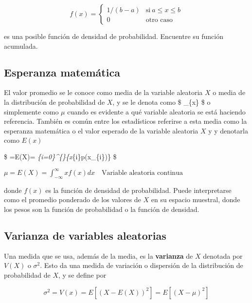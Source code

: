 \documentclass[11pt]{article}
\begin{document}
\begin{equation}
     \label{eq:aqui-le-mostramos-como-hacerle-la-llave-grande}
     f(x) = \left\{
           \begin{array}{ll}
             1/(b-a)     & \mathrm{si\ } a \leq x \le b \\
             0 & \mathrm{\text{otro caso}  } 
           \end{array}
         \right.
   \end{equation}

es una posible función de densidad de probabilidad. Encuentre su función
acumulada.

    \hypertarget{esperanza-matemuxe1tica}{%
\subsection{Esperanza matemática}\label{esperanza-matemuxe1tica}}

El valor promedio se le conoce como media de la variable aleatoria \(X\)
o media de la distribución de probabilidad de \(X\), y se le denota como
\$ \mu\_\{x\} \$ o simplemente como \(\mu\) cuando es evidente a qué
variable aleatoria se está haciendo referencia. También es común entre
los estadísticos referirse a esta media como la esperanza matemática o
el valor esperado de la variable aleatoria \(X\) y y denotarla como
\(E(x)\)

\$ \mu=E(X)= \sum\emph{\{i=0\}\^{}\{\infty\}\{x}\{i\}p(x\_\{i\})\}
\quad {}\$

\(\mu=E(X)= \int_{-\infty}^{\infty}{xf(x)dx} \quad \text{Variable aleatoria continua}\)

donde \(f(x)\) es la función de densidad de probabilidad. Puede
interpretarse como el promedio ponderado de los valores de \(X\) en su
espacio muestral, donde los pesos son la función de probabilidad o la
función de densidad.

\hypertarget{varianza-de-variables-aleatorias}{%
\subsection{Varianza de variables
aleatorias}\label{varianza-de-variables-aleatorias}}

Una medida que se usa, además de la media, es la \textbf{varianza} de
\(X\) denotada por \(V(X)\) o \(\sigma^{2}\). Esto da una medida de
variación o dispersión de la distribución de probabilidad de \(X\), y se
define por

\[
\sigma^{2}=V(x)= E[(X-E(X))^2]= E[(X-\mu)^2]
\]
\end{document}
